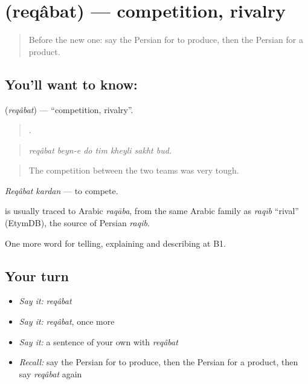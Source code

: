 \section[\texorpdfstring{\fa{رقابت} (reqâbat)}{رقابت (reqâbat)}]{ (reqâbat) — competition, rivalry}

\label{lesson:FA-C383-reqabat}



\begin{quote}
Before the new one: say the Persian for to produce, then the Persian for a product.
\end{quote}

\subsection*{You'll want to know: }
\textbf{} (\emph{reqâbat}) — \textquotedblleft{}competition, rivalry\textquotedblright{}.

\begin{quote}
      .
\end{quote}

\begin{quote}
\emph{reqâbat beyn-e do tim kheyli sakht bud.}
\end{quote}

\begin{quote}
The competition between the two teams was very tough.
\end{quote}

\emph{Reqâbat kardan} — to compete.

\begin{cousinweb}
\textbf{} is usually traced to Arabic \emph{raqāba}, from the same Arabic family as \emph{raqīb} \textquotedblleft{}rival\textquotedblright{} (EtymDB), the source of Persian \emph{raqib}.
\end{cousinweb}

\begin{grammarlens}[title={What you've built}]
One more word for telling, explaining and describing at B1.
\end{grammarlens}

\subsection*{Your turn}
\begin{itemize}
\raggedright
  \item \emph{Say it:} \emph{reqâbat}
  \item \emph{Say it:} \emph{reqâbat}, once more
  \item \emph{Say it:} a sentence of your own with \emph{reqâbat}
  \item \emph{Recall:} say the Persian for to produce, then the Persian for a product, then say \emph{reqâbat} again
\end{itemize}

